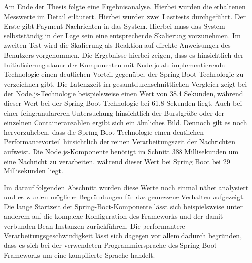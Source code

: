 Am Ende der Thesis folgte eine Ergebnisanalyse. Hierbei wurden die erhaltenen Messwerte im Detail erläutert. Hierbei wurden zwei Lasttests durchgeführt. Der Erste gibt Payment-Nachrichten in das System. Hierbei muss das System selbstständig in der Lage sein eine entsprechende Skalierung vorzunehmen. Im zweiten Test wird die Skalierung als Reaktion auf direkte Anweisungen des Benutzers vorgenommen. Die Ergebnisse hierbei zeigen, dass es hinsichtlich der Initialisierungsdauer der Komponenten mit Node.js als implementierende Technologie einen deutlichen Vorteil gegenüber der Spring-Boot-Technologie zu verzeichnen gibt. Die Latenzzeit im gesamtdurchschnittlichen Vergleich zeigt bei der Node.js-Technologie beispielsweise einen Wert von 38.4 Sekunden, während dieser Wert bei der Spring Boot Technologie bei 61.8 Sekunden liegt. Auch bei einer feingranulareren Untersuchung hinsichtlich der Burstgröße oder der einzelnen Containeranzahlen ergibt sich ein ähnliches Bild. Dennoch gilt es noch hervorzuheben, dass die Spring Boot Technologie einen deutlichen Performancevorteil hinsichtlich der reinen Verarbeitungszeit der Nachrichten aufweist. Die Node.js-Komponente benötigt im Schnitt 388 Millisekunden um eine Nachricht zu verarbeiten, während dieser Wert bei Spring Boot bei 29 Millisekunden liegt. 

Im darauf folgenden Abschnitt wurden diese Werte noch einmal näher analysiert und es wurden mögliche Begründungen für das gemessene Verhalten aufgezeigt. Die lange Startzeit der Spring-Boot-Komponente lässt sich beispielsweise unter anderem auf die komplexe Konfiguration des Frameworks und der damit verbunden Bean-Instanzen zurückführen. Die performantere Verarbeitungsgeschwindigkeit lässt sich dagegen vor allem dadurch begründen, dass es sich bei der verwendeten Programmiersprache des Spring-Boot-Frameworks um eine kompilierte Sprache handelt.